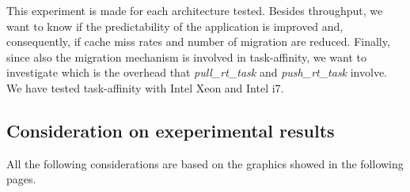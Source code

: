 This experiment is made for each architecture tested. Besides throughput, we want to know if the predictability of the application is improved and, 
consequently, if cache miss rates and number of migration are reduced. Finally, since also the migration mechanism is involved in task-affinity, we want 
to investigate which is the overhead that \textit{pull\_rt\_task} and \textit{push\_rt\_task} involve. We have tested task-affinity with Intel Xeon and 
Intel i7.

\subsection{Consideration on exeperimental results}

All the following considerations are based on the graphics showed in the following pages.
